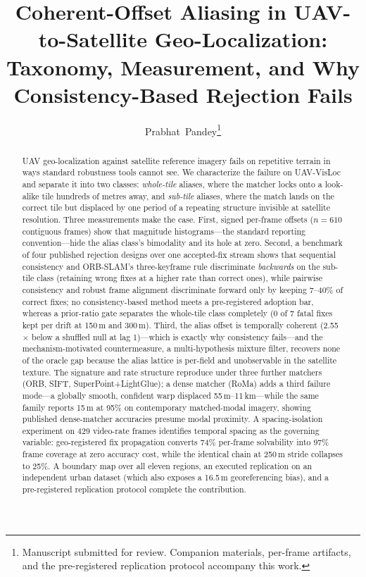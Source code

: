 \documentclass[journal]{IEEEtran}
\begin{document}
\title{Coherent-Offset Aliasing in UAV-to-Satellite Geo-Localization:\\ Taxonomy, Measurement, and Why Consistency-Based Rejection Fails}

\author{Prabhat~Pandey\thanks{Manuscript submitted for review. Companion materials, per-frame artifacts, and the pre-registered replication protocol accompany this work.}}


\maketitle

\begin{abstract}
UAV geo-localization against satellite reference imagery fails on repetitive terrain in ways standard robustness tools cannot see. We characterize the failure on UAV-VisLoc and separate it into two classes: \emph{whole-tile} aliases, where the matcher locks onto a look-alike tile hundreds of metres away, and \emph{sub-tile} aliases, where the match lands on the correct tile but displaced by one period of a repeating structure invisible at satellite resolution. Three measurements make the case. First, signed per-frame offsets ($n=610$ contiguous frames) show that magnitude histograms---the standard reporting convention---hide the alias class's bimodality and its hole at zero. Second, a benchmark of four published rejection designs over one accepted-fix stream shows that sequential consistency and ORB-SLAM's three-keyframe rule discriminate \emph{backwards} on the sub-tile class (retaining wrong fixes at a higher rate than correct ones), while pairwise consistency and robust frame alignment discriminate forward only by keeping 7--40\% of correct fixes; no consistency-based method meets a pre-registered adoption bar, whereas a prior-ratio gate separates the whole-tile class completely (0 of 7 fatal fixes kept per drift at 150\,m and 300\,m). Third, the alias offset is temporally coherent (2.55$\times$ below a shuffled null at lag 1)---which is exactly why consistency fails---and the mechanism-motivated countermeasure, a multi-hypothesis mixture filter, recovers none of the oracle gap because the alias lattice is per-field and unobservable in the satellite texture. The signature and rate structure reproduce under three further matchers (ORB, SIFT, SuperPoint+LightGlue); a dense matcher (RoMa) adds a third failure mode---a globally smooth, confident warp displaced 55\,m--11\,km---while the same family reports 15\,m at 95\% on contemporary matched-modal imagery, showing published dense-matcher accuracies presume modal proximity. A spacing-isolation experiment on 429 video-rate frames identifies temporal spacing as the governing variable: geo-registered fix propagation converts 74\% per-frame solvability into 97\% frame coverage at zero accuracy cost, while the identical chain at 250\,m stride collapses to 25\%. A boundary map over all eleven regions, an executed replication on an independent urban dataset (which also exposes a 16.5\,m georeferencing bias), and a pre-registered replication protocol complete the contribution.
\end{abstract}
\end{document}
